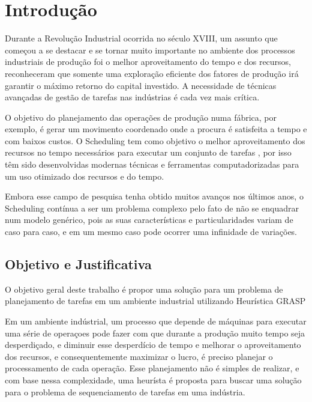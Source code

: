 \chapter{Introdução}

Durante a Revolução Industrial ocorrida no século XVIII, um assunto que começou a se destacar e se tornar muito importante no ambiente dos processos industriais de produção foi o melhor aproveitamento do tempo e dos recursos, reconheceram que somente uma exploração eficiente dos fatores de produção irá garantir o máximo retorno do capital investido. A necessidade de técnicas avançadas de gestão de tarefas nas indústrias é cada vez mais crítica.

O objetivo do planejamento das operações de produção numa fábrica, por exemplo, é gerar um movimento coordenado onde a procura é satisfeita a tempo e com baixos custos. O Scheduling tem como objetivo o melhor aproveitamento dos recursos no tempo necessários para executar um conjunto de tarefas \cite{BAKER}, por isso têm sido desenvolvidas modernas técnicas e ferramentas computadorizadas para um uso otimizado dos recursos e do tempo. 
	
Embora esse campo de pesquisa tenha obtido muitos avanços nos últimos anos, o Scheduling contínua a ser um problema complexo pelo fato de não se enquadrar num modelo genérico, pois as suas características e particularidades variam de caso para caso, e em um mesmo caso pode ocorrer uma infinidade de variações.   

\section{Objetivo e Justificativa}

O objetivo geral deste trabalho é propor uma solução para um problema de planejamento de tarefas em um ambiente industrial utilizando Heurística GRASP

Em um ambiente indústrial, um processo que depende de máquinas para executar uma série de operaçoes pode fazer com que durante a produção muito tempo seja desperdiçado, e  diminuir esse desperdício de tempo e melhorar o aproveitamento dos recursos, e consequentemente maximizar o lucro, é preciso planejar o processamento de cada operação. Esse planejamento não é simples de realizar, e com base nessa complexidade, uma heurísta é proposta para buscar uma solução para o problema de sequenciamento de tarefas em uma indústria.

